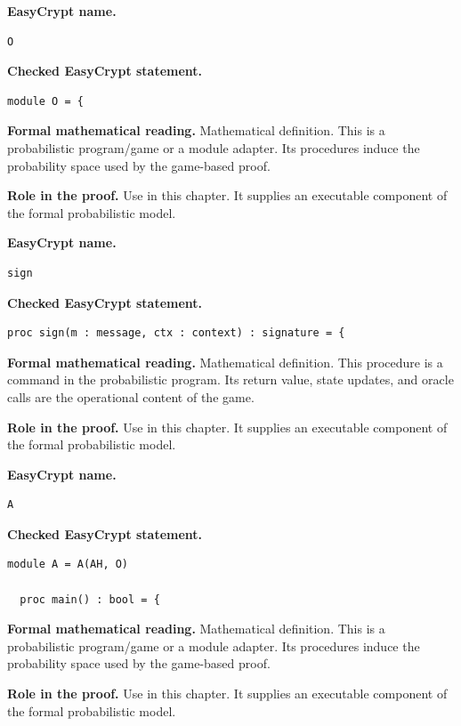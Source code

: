 \begin{formaldefinition}
\noindent\textbf{EasyCrypt name.}
\begin{lstlisting}[language=EasyCrypt,basicstyle=\ttfamily\scriptsize]
O
\end{lstlisting}
\noindent\textbf{Checked EasyCrypt statement.}
\begin{lstlisting}[language=EasyCrypt,basicstyle=\ttfamily\scriptsize]
module O = {
\end{lstlisting}
\noindent\textbf{Formal mathematical reading.}
Mathematical definition. This is a probabilistic program/game or a module adapter.  Its procedures induce the probability space used by the game-based proof.

\noindent\textbf{Role in the proof.}
Use in this chapter. It supplies an executable component of the formal probabilistic model.

\end{formaldefinition}

\begin{formaldefinition}
\noindent\textbf{EasyCrypt name.}
\begin{lstlisting}[language=EasyCrypt,basicstyle=\ttfamily\scriptsize]
sign
\end{lstlisting}
\noindent\textbf{Checked EasyCrypt statement.}
\begin{lstlisting}[language=EasyCrypt,basicstyle=\ttfamily\scriptsize]
proc sign(m : message, ctx : context) : signature = {
\end{lstlisting}
\noindent\textbf{Formal mathematical reading.}
Mathematical definition. This procedure is a command in the probabilistic program.  Its return value, state updates, and oracle calls are the operational content of the game.

\noindent\textbf{Role in the proof.}
Use in this chapter. It supplies an executable component of the formal probabilistic model.

\end{formaldefinition}

\begin{formaldefinition}
\noindent\textbf{EasyCrypt name.}
\begin{lstlisting}[language=EasyCrypt,basicstyle=\ttfamily\scriptsize]
A
\end{lstlisting}
\noindent\textbf{Checked EasyCrypt statement.}
\begin{lstlisting}[language=EasyCrypt,basicstyle=\ttfamily\scriptsize]
module A = A(AH, O)

  proc main() : bool = {
\end{lstlisting}
\noindent\textbf{Formal mathematical reading.}
Mathematical definition. This is a probabilistic program/game or a module adapter.  Its procedures induce the probability space used by the game-based proof.

\noindent\textbf{Role in the proof.}
Use in this chapter. It supplies an executable component of the formal probabilistic model.

\end{formaldefinition}

